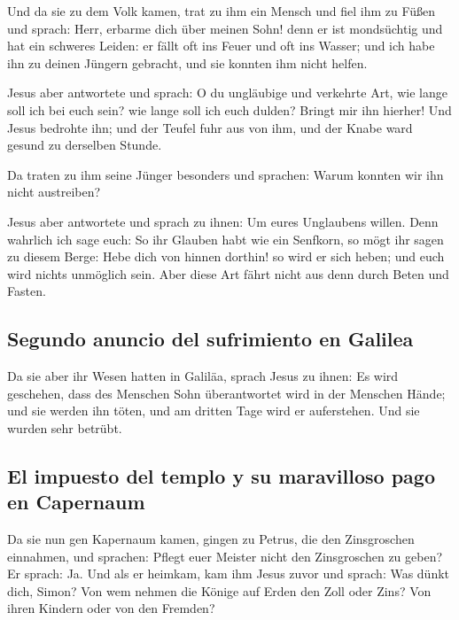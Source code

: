  Und da sie zu dem Volk kamen, trat zu ihm ein Mensch und
fiel ihm zu Füßen  und sprach: Herr, erbarme dich über
meinen Sohn! denn er ist mondsüchtig und hat ein schweres Leiden: er
fällt oft ins Feuer und oft ins Wasser;  und ich habe ihn
zu deinen Jüngern gebracht, und sie konnten ihm nicht helfen.

 Jesus aber antwortete und sprach: O du ungläubige und
verkehrte Art, wie lange soll ich bei euch sein? wie lange soll ich euch
dulden? Bringt mir ihn hierher!  Und Jesus bedrohte ihn;
und der Teufel fuhr aus von ihm, und der Knabe ward gesund zu derselben
Stunde.

 Da traten zu ihm seine Jünger besonders und sprachen:
Warum konnten wir ihn nicht austreiben?

 Jesus aber antwortete und sprach zu ihnen: Um eures
Unglaubens willen. Denn wahrlich ich sage euch: So ihr Glauben habt wie
ein Senfkorn, so mögt ihr sagen zu diesem Berge: Hebe dich von hinnen
dorthin! so wird er sich heben; und euch wird nichts unmöglich sein.
 Aber diese Art fährt nicht aus denn durch Beten und
Fasten.

\hypertarget{segundo-anuncio-del-sufrimiento-en-galilea}{%
\subsection{Segundo anuncio del sufrimiento en
Galilea}\label{segundo-anuncio-del-sufrimiento-en-galilea}}

 Da sie aber ihr Wesen hatten in Galiläa, sprach Jesus zu
ihnen: Es wird geschehen, dass des Menschen Sohn überantwortet wird in
der Menschen Hände;  und sie werden ihn töten, und am
dritten Tage wird er auferstehen. Und sie wurden sehr betrübt.

\hypertarget{el-impuesto-del-templo-y-su-maravilloso-pago-en-capernaum}{%
\subsection{El impuesto del templo y su maravilloso pago en
Capernaum}\label{el-impuesto-del-templo-y-su-maravilloso-pago-en-capernaum}}

 Da sie nun gen Kapernaum kamen, gingen zu Petrus, die
den Zinsgroschen einnahmen, und sprachen: Pflegt euer Meister nicht den
Zinsgroschen zu geben?  Er sprach: Ja. Und als er
heimkam, kam ihm Jesus zuvor und sprach: Was dünkt dich, Simon? Von wem
nehmen die Könige auf Erden den Zoll oder Zins? Von ihren Kindern oder
von den Fremden?

